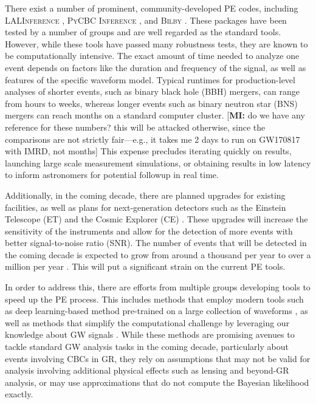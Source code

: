 \documentclass[twocolumn]{aastex631}
\newcommand{\mi}[1]{\textsf{\color{teal}[\textbf{MI:} #1]}}
\begin{document}
There exist a number of prominent, community-developed PE codes, including \textsc{LALInference}
\cite{Veitch:2014wba}, \textsc{PyCBC Inference} \cite{Biwer:2018osg}, and \textsc{Bilby}
\cite{Ashton:2018jfp}.
These packages have been tested by a number of groups and
are well regarded as the standard tools. However, while these tools have passed
many robustness tests, they are known to be computationally intensive. The exact
amount of time needed to analyze one event depends on factors like the duration and frequency of the signal, as well as features of the specific waveform model.
Typical runtimes for production-level analyses of shorter events, such as binary
black hole (BBH) mergers, can range from hours to weeks, whereas longer events such as binary neutron star (BNS) mergers can reach months on a standard computer cluster.
\mi{do we have any reference for these numbers? this will be attacked otherwise, since the comparisons are not strictly fair---e.g., it takes me 2 days to run on GW170817 with IMRD, not months}
This expense precludes iterating quickly on results, launching large scale measurement simulations, or obtaining results in low latency to inform astronomers for potential followup in real time.

Additionally, in
the coming decade, there are planned upgrades for existing facilities, as well as
plans for next-generation detectors such as the Einstein Telescope (ET)
\cite{Punturo:2010zz} and the Cosmic Explorer (CE)
\cite{LIGOScientific:2016wof}. These upgrades will increase the sensitivity of
the instruments and allow for the detection of more events with better
signal-to-noise ratio (SNR). The number of events that will be detected in the
coming decade is expected to grow from around a thousand per year to over a
million per year \cite{Baibhav:2019gxm}. This will put a significant strain on
the current PE tools.

In order to address this, there are efforts from multiple groups developing
tools to speed up the PE process. This includes methods that employ modern
tools such as deep learning-based method pre-trained on a large collection of
waveforms \cite{Dax:2021tsq,Dax:2022pxd}, as well as methods that simplify the
computational challenge by leveraging our knowledge about GW signals
\cite{Islam:2022afg,Roulet:2022kot}. While these methods are promising avenues
to tackle standard GW analysis tasks in the coming decade, particularly about
events involving CBCs in GR, they rely on assumptions that may not be valid for
analysis involving additional physical effects such as lensing and beyond-GR
analysis, or may use approximations that do not compute the Bayesian likelihood
exactly.
\end{document}
